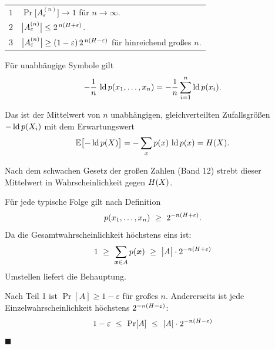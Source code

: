 \begin{merksatz}
\begin{center}
{\small
\renewcommand{\arraystretch}{1.55}
\begin{tabular}{@{}P{1.0cm}P{7.4cm}@{}}
\toprule
$1$ & $\Pr\bigl[A_\varepsilon^{(n)}\bigr] \to 1$ für $n\to\infty$.\\
$2$ & $\bigl|A_\varepsilon^{(n)}\bigr| \le 2^{\,n(H+\varepsilon)}$.\\
$3$ & $\bigl|A_\varepsilon^{(n)}\bigr| \ge (1-\varepsilon)\,2^{\,n(H-\varepsilon)}$ für hinreichend großes $n$.\\
\bottomrule
\end{tabular}}
\end{center}

Für unabhängige Symbole gilt
\[ -\frac1n\,\operatorname{ld} p(x_1,\ldots,x_n) = -\frac1n\sum_{i=1}^{n} \operatorname{ld} p(x_i) . \]

Das ist der Mittelwert von $n$ unabhängigen, gleichverteilten Zufallsgrößen $-\operatorname{ld} p(X_i)$ mit dem Erwartungswert
\[ \mathbb{E}\bigl[-\operatorname{ld} p(X)\bigr] = -\sum_x p(x)\,\operatorname{ld} p(x) = H(X) . \]

Nach dem schwachen Gesetz der großen Zahlen (Band 12) strebt dieser Mittelwert in Wahrscheinlichkeit gegen $H(X)$. \checkmark

Für jede typische Folge gilt nach Definition
\[ p(x_1,\ldots,x_n) \ \ge\ 2^{-n(H+\varepsilon)} . \]
Da die Gesamtwahrscheinlichkeit höchstens eins ist:
\[ 1 \ \ge\ \sum_{\vek{x}\in A} p(\vek{x}) \ \ge\ \bigl|A\bigr|\cdot 2^{-n(\Ent+\varepsilon)} \]
Umstellen liefert die Behauptung. \checkmark

Nach Teil 1 ist $\Pr[A] \ge 1-\varepsilon$ für großes $n$. Andererseits ist jede Einzelwahrscheinlichkeit höchstens $2^{-n(H-\varepsilon)}$:
\[ 1-\varepsilon \ \le\ \Pr[A] \ \le\ |A|\cdot 2^{-n(H-\varepsilon)} \]
$\blacksquare$

\begin{center}
\begin{minipage}{0.88\textwidth}
\end{minipage}
\end{center}
\end{merksatz}

